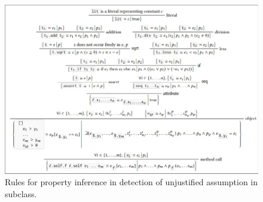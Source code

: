 \begin{figure}
  \includegraphics[width=\textwidth]{figs/properties}
  \caption{Rules for property inference in detection of unjustified assumption in subclass.}
  \label{fig:property_inference}
\end{figure}



